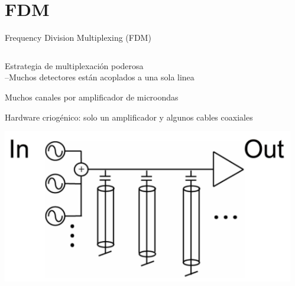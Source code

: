 \documentclass[ignorenonframetext,12pt]{beamer}
\begin{document}
\section{FDM}
\begin{frame}{Frequency Division Multiplexing (FDM)}
				\begin{columns}
								\begin{column}{0.5\textwidth}
												\begin{itemize}
																\item[o]	Estrategia de multiplexación poderosa\\
												\qquad --\footnotesize{Muchos detectores están acoplados
												a una sola linea}
								\normalsize{\item[o] Muchos canales por amplificador de microondas
								\item[o] Hardware criogénico: solo un amplificador y algunos
												cables coaxiales}
												\end{itemize}
				\begin{center}
								\includegraphics[width=\textwidth]{fdm1}
				\end{center}
								\end{column}
								\begin{column}{0.5\textwidth}
								\begin{center}

\end{center}
\end{column}
\end{columns}
\end{frame}
\end{document}
